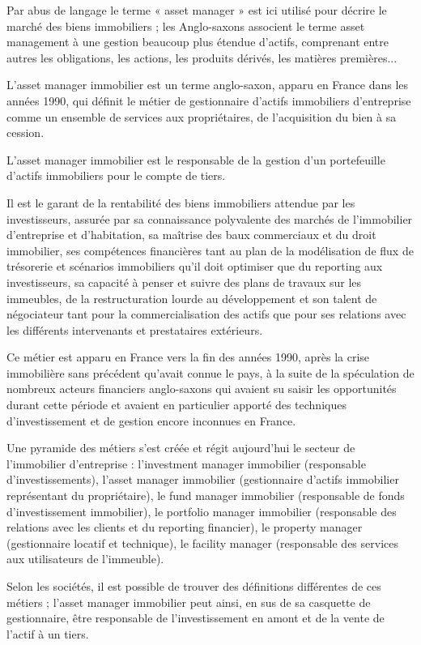 \par Par abus de langage le terme « asset manager » est ici utilisé pour décrire le marché des biens immobiliers ; les Anglo-saxons associent le terme asset management à une gestion beaucoup plus étendue d'actifs, comprenant entre autres les obligations, les actions, les produits dérivés, les matières premières...
\par L’asset manager immobilier est un terme anglo-saxon, apparu en France dans les années 1990, qui définit le métier de gestionnaire d'actifs immobiliers d'entreprise comme un ensemble de services aux propriétaires, de l'acquisition du bien à sa cession.
\par L’asset manager immobilier est le responsable de la gestion d'un portefeuille d'actifs immobiliers pour le compte de tiers.
\par Il est le garant de la rentabilité des biens immobiliers attendue par les investisseurs, assurée par sa connaissance polyvalente des marchés de l'immobilier d'entreprise et d'habitation, sa maîtrise des baux commerciaux et du droit immobilier, ses compétences financières tant au plan de la modélisation de flux de trésorerie et scénarios immobiliers qu'il doit optimiser que du reporting aux investisseurs, sa capacité à penser et suivre des plans de travaux sur les immeubles, de la restructuration lourde au développement et son talent de négociateur tant pour la commercialisation des actifs que pour ses relations avec les différents intervenants et prestataires extérieurs.
\par Ce métier est apparu en France vers la fin des années 1990, après la crise immobilière sans précédent qu'avait connue le pays, à la suite de la spéculation de nombreux acteurs financiers anglo-saxons qui avaient su saisir les opportunités durant cette période et avaient en particulier apporté des techniques d'investissement et de gestion encore inconnues en France.
\par Une pyramide des métiers s'est créée et régit aujourd'hui le secteur de l'immobilier d'entreprise : l’investment manager immobilier (responsable d'investissements), l’asset manager immobilier (gestionnaire d'actifs immobilier représentant du propriétaire), le fund manager immobilier (responsable de fonds d'investissement immobilier), le portfolio manager immobilier (responsable des relations avec les clients et du reporting financier), le property manager (gestionnaire locatif et technique), le facility manager (responsable des services aux utilisateurs de l'immeuble).
\par Selon les sociétés, il est possible de trouver des définitions différentes de ces métiers ; l’asset manager immobilier peut ainsi, en sus de sa casquette de gestionnaire, être responsable de l'investissement en amont et de la vente de l'actif à un tiers.
